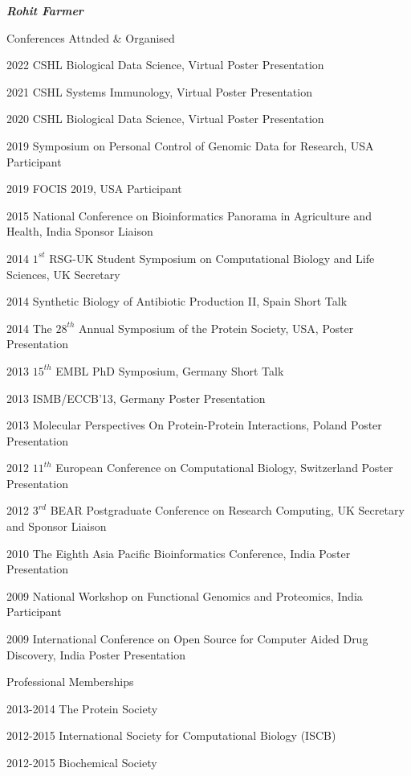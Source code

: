 \documentclass[10pt]{article}
\begin{document}
\begin{cv}{\huge \it \bfseries Rohit Farmer}
\vskip3pt
\begin{cvlist}{Conferences Attnded \& Organised}
    \item[2022] CSHL Biological Data Science, Virtual \hfill Poster Presentation 
    \item[2021] CSHL Systems Immunology, Virtual \hfill Poster Presentation 
    \item[2020] CSHL Biological Data Science, Virtual \hfill Poster Presentation 
    \item[2019] Symposium on Personal Control of Genomic Data for Research, USA \hfill Participant 
    \item[2019] FOCIS 2019, USA \hfill Participant
    \item[2015] National Conference on Bioinformatics Panorama in Agriculture and Health, India \hfill Sponsor Liaison
	\item[2014] $1^{st}$ RSG-UK Student Symposium on Computational Biology and Life Sciences, UK \hfill Secretary
	\item[2014] Synthetic Biology of Antibiotic Production II, Spain \hfill Short Talk
	\item[2014] The $28^{th}$ Annual Symposium of the Protein Society, USA, \hfill Poster Presentation
	\item[2013] $15^{th}$ EMBL PhD Symposium, Germany \hfill Short Talk
	\item[2013] ISMB/ECCB'13, Germany \hfill Poster Presentation
	\item[2013] Molecular Perspectives On Protein-Protein Interactions, Poland \hfill Poster Presentation
	\item[2012] $11^{th}$ European Conference on Computational Biology, Switzerland \hfill Poster Presentation
	\item[2012] $3^{rd}$ BEAR Postgraduate Conference on Research Computing, UK \hfill Secretary and Sponsor Liaison
	\item[2010] The Eighth Asia Pacific Bioinformatics Conference, India \hfill Poster Presentation
	\item[2009] National Workshop on Functional Genomics and Proteomics, India \hfill Participant
	\item[2009] International Conference on Open Source for Computer Aided Drug Discovery, India \hfill Poster Presentation
\end{cvlist}

\vskip3pt
\begin{cvlist}{Professional Memberships}
	\item[2013-2014] The Protein Society
	\item[2012-2015] International Society for Computational Biology (ISCB)
	\item[2012-2015] Biochemical Society
\end{cvlist}


\end{cv}
\end{document}
